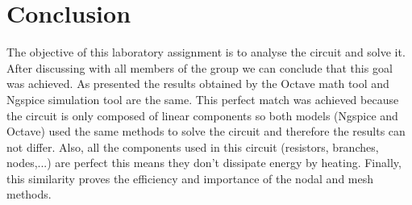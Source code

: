 \newpage
\section{Conclusion}
\label{sec:conclusion}


The objective of this laboratory assignment is to analyse the circuit and solve it. After discussing with all members of the group we can conclude that this goal was achieved.
As presented the results obtained by the Octave math tool and Ngspice simulation tool are the same. This perfect match was achieved because the circuit is only composed of linear components so both models (Ngspice and Octave) used the same methods to solve the circuit and therefore the results can not differ.
Also, all the components used in this circuit (resistors, branches, nodes,...) are perfect this means they don't dissipate energy by heating.
Finally, this similarity proves the efficiency and importance of the nodal and mesh methods.



